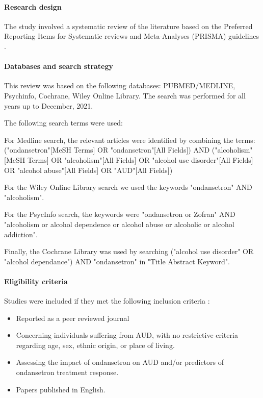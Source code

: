 \paragraph{Research design}

The study involved a systematic review of the literature based on the Preferred Reporting Items for Systematic reviews and Meta-Analyses (PRISMA) guidelines \cite{page2021prisma}.

\paragraph{Databases and search strategy}

This review was based on the following databases: PUBMED/MEDLINE, Psychinfo, Cochrane, Wiley Online Library. The search was performed for all years up to December, 2021. 

The following search terms were used:

For Medline search, the relevant articles were identified by combining the terms: ("ondansetron"[MeSH Terms] OR "ondansetron"[All Fields]) AND ("alcoholism"[MeSH Terms] OR "alcoholism"[All Fields] OR "alcohol use disorder"[All Fields] OR "alcohol abuse"[All Fields] OR "AUD"[All Fields])

For the Wiley Online Library search we used the keywords "ondansetron" AND "alcoholism".

For the PsycInfo search, the keywords were "ondansetron or Zofran" AND "alcoholism or alcohol dependence or alcohol abuse or alcoholic or alcohol addiction".

Finally, the Cochrane Library was used by searching ("alcohol use disorder" OR "alcohol dependance") AND "ondansetron" in "Title Abstract Keyword".

\paragraph{Eligibility criteria}

Studies were included if they met the following inclusion criteria :
\begin{itemize}
\setlength\itemsep{-0.5em}
 \item Reported as a peer reviewed journal
 \item Concerning individuals suffering from AUD, with no restrictive criteria regarding age, sex, ethnic origin, or place of living.
 \item Assessing the impact of ondansetron on AUD and/or predictors of ondansetron treatment response.
 \item Papers published in English.
\end{itemize}

